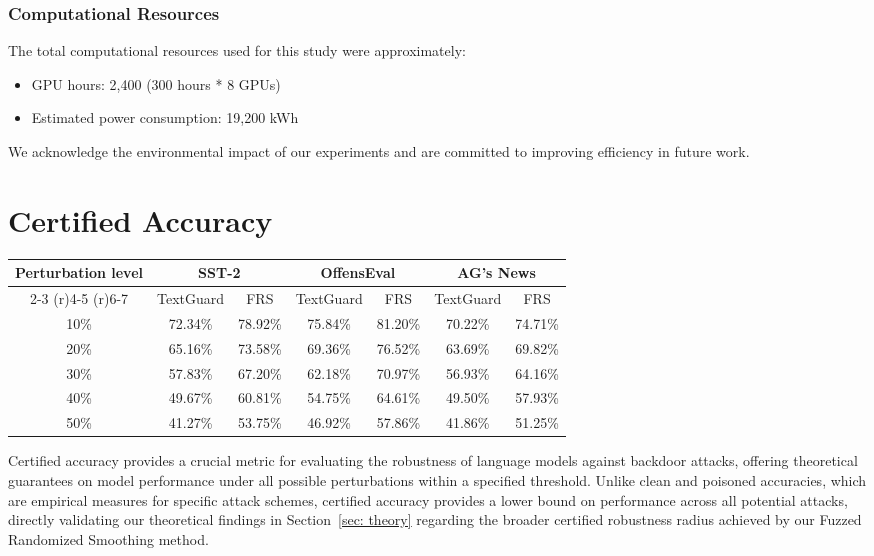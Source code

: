 \subsubsection{Computational Resources}
The total computational resources used for this study were approximately:
\begin{itemize}[leftmargin=*]
    \item GPU hours: 2,400 (300 hours * 8 GPUs)
    \item Estimated power consumption: 19,200 kWh
\end{itemize}

We acknowledge the environmental impact of our experiments and are committed to improving efficiency in future work.


\section{Certified Accuracy}
\label{appendix: certified accuracy}
\begin{table*}[h]
\caption{Certified accuracy under different perturbation levels on SST-2, OffensEval, and AG's News.}
\centering
\small
\renewcommand\arraystretch{0.9}
\begin{tabular}{ccccccc}
\toprule
\multirow{2}{*}{Perturbation level} & \multicolumn{2}{c}{SST-2} & \multicolumn{2}{c}{OffensEval} & \multicolumn{2}{c}{AG's News} \\
\cmidrule(r){2-3} \cmidrule(r){4-5} \cmidrule(r){6-7}
& TextGuard & FRS & TextGuard & FRS & TextGuard & FRS \\
\midrule
10\% & 72.34\% & 78.92\% & 75.84\% & 81.20\% & 70.22\% & 74.71\% \\
20\% & 65.16\% & 73.58\% & 69.36\% & 76.52\% & 63.69\% & 69.82\% \\
30\% & 57.83\% & 67.20\% & 62.18\% & 70.97\% & 56.93\% & 64.16\% \\
40\% & 49.67\% & 60.81\% & 54.75\% & 64.61\% & 49.50\% & 57.93\% \\
50\% & 41.27\% & 53.75\% & 46.92\% & 57.86\% & 41.86\% & 51.25\% \\
\bottomrule 
\end{tabular}
\label{tab:certified_accuracy}
\end{table*}
Certified accuracy provides a crucial metric for evaluating the robustness of language models against backdoor attacks, offering theoretical guarantees on model performance under all possible perturbations within a specified threshold. Unlike clean and poisoned accuracies, which are empirical measures for specific attack schemes, certified accuracy provides a lower bound on performance across all potential attacks, directly validating our theoretical findings in Section~\ref{sec: theory} regarding the broader certified robustness radius achieved by our Fuzzed Randomized Smoothing method.

